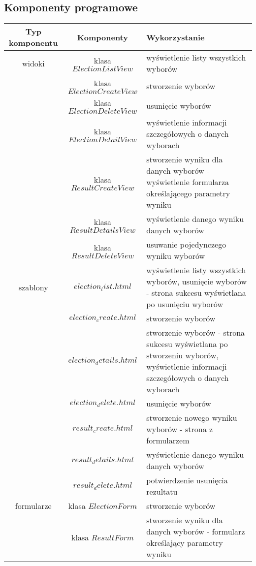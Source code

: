\documentclass[pdflatex,11pt]{../aghdoc_version2}
\begin{document}
\subsection{Komponenty programowe}
\begin{tabular}{|c|c|p{5cm}|}
\hline 
\textbf{Typ komponentu} & \textbf{Komponenty} & \textbf{Wykorzystanie} \\ 
\hline 
widoki & klasa $ElectionListView$ & wyświetlenie listy wszystkich wyborów \\ 
\cline{2-3} 
 & klasa $ElectionCreateView$ & stworzenie wyborów \\ 
\cline{2-3} 
 & klasa $ElectionDeleteView$ & usunięcie wyborów \\ 
\cline{2-3} 
 & klasa $ElectionDetailView$ & wyświetlenie informacji szczegółowych o
danych wyborach \\ 
\cline{2-3} 
 & klasa $ResultCreateView$ & stworzenie wyniku dla danych wyborów -
wyświetlenie formularza określającego
parametry wyniku \\ 
\cline{2-3} 
 & klasa $ResultDetailsView$ & wyświetlenie danego wyniku danych
wyborów \\ 
\cline{2-3} 
 & klasa $ResultDeleteView$ & usuwanie pojedynczego wyniku wyborów \\ 
\hline 
szablony & $election_list.html$ & wyświetlenie listy wszystkich wyborów,
usunięcie wyborów - strona sukcesu
wyświetlana po usunięciu wyborów \\ 
\cline{2-3} 
 & $election_create.html$ & stworzenie wyborów \\ 
\cline{2-3} 
 & $election_details.html$ & stworzenie wyborów - strona sukcesu
wyświetlana po stworzeniu wyborów,
wyświetlenie informacji szczegółowych o
danych wyborach \\ 
\cline{2-3} 
 & $election_delete.html$ & usunięcie wyborów \\ 
\cline{2-3} 
 & $result_create.html$ & stworzenie nowego wyniku wyborów -
strona z formularzem \\ 
\cline{2-3} 
 & $result_details.html$ & wyświetlenie danego wyniku danych
wyborów \\ 
\cline{2-3} 
 & $result_delete.html$ & potwierdzenie usunięcia rezultatu \\ 
\hline 
formularze & klasa $ElectionForm$ & stworzenie wyborów \\ 
\cline{2-3}
 & klasa $ResultForm$ & stworzenie wyniku dla danych wyborów -
formularz określający parametry wyniku \\
\hline 
\end{tabular} 
\end{document}

